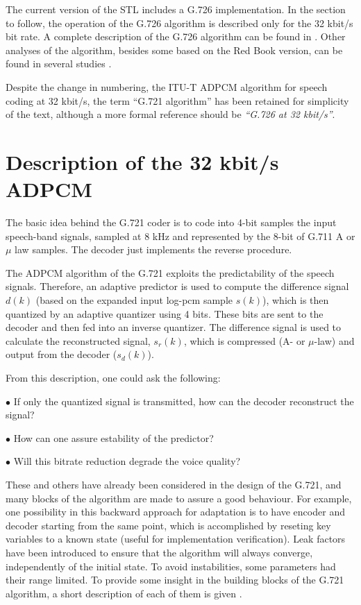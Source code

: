 The current version of the STL includes a G.726 implementation. In the
section to follow, the operation of the G.726 algorithm is described
only for the 32 kbit/s bit rate. A complete description of the G.726
algorithm can be found in \cite{G.726}. Other analyses of the
algorithm, besides some based on the Red Book version, can be found in
several studies \cite{ADPCM-theor,ADPCM-over,ADPCM-Tech-Report}.

Despite the change in numbering, the ITU-T ADPCM algorithm for speech
coding at 32 kbit/s, the term ``G.721 algorithm'' has been retained
for simplicity of the text, although a more formal reference
should be {\em ``G.726 at 32 kbit/s''}.

\section{Description of the 32 kbit/s ADPCM}

The basic idea behind the G.721 coder is to code into 4-bit samples the
input speech-band signals, sampled at 8 kHz and represented by the
8-bit of G.711 A or $\mu$ law samples. The decoder just implements the
reverse procedure.

The ADPCM algorithm of the G.721 exploits the predictability of the
speech signals. Therefore, an adaptive predictor is used to compute the
difference signal $d(k)$ (based on the expanded input log-pcm sample
$s(k)$), which is then quantized by an adaptive quantizer using 4 bits.
These bits are sent to the decoder and then fed into an inverse
quantizer. The difference signal is used to calculate the reconstructed
signal, $s_r(k)$, which is compressed (A- or $\mu$-law) and output from
the decoder ($s_d(k)$).

From this description, one could ask the following:

\begin{minipage}{140mm}
 $\bullet$ If only the quantized signal is transmitted, how can the
        decoder reconstruct   the signal?

 $\bullet$ How can one assure estability of the predictor?

 $\bullet$ Will this bitrate reduction degrade the voice quality?
\end{minipage}

These and others have already been considered in the design of the
G.721, and many blocks of the algorithm are made to assure a good
behaviour. For example, one possibility in this backward approach for
adaptation is to have encoder and decoder starting from the same point,
which is accomplished by reseting key variables to a known state
(useful for implementation verification). Leak factors have been
introduced to ensure that the algorithm will always converge,
independently of the initial state. To avoid instabilities, some
parameters had their range limited. To provide some insight in the
building blocks of the G.721 algorithm, a short description of each of
them is given \cite{G.726,ADPCM-over}.


